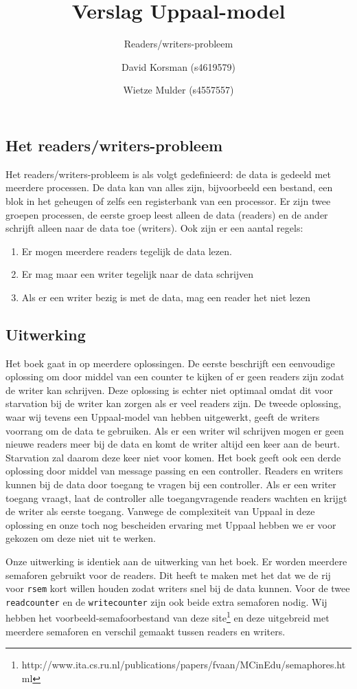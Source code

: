 \documentclass{article}
\title{Verslag Uppaal-model}
\subtitle{Readers/writers-probleem}
\author{David Korsman (s4619579) \and Wietze Mulder (s4557557)}
\begin{document}
\maketitle

\subsection*{Het readers/writers-probleem}
Het readers/writers-probleem is als volgt gedefinieerd: de data is gedeeld met meerdere processen. De data kan van alles zijn, bijvoorbeeld een bestand, een blok in het geheugen of zelfs een registerbank van een processor. Er zijn twee groepen processen, de eerste groep leest alleen de data (readers) en de ander schrijft alleen naar de data toe (writers). Ook zijn er een aantal regels:
\begin{enumerate}
\item Er mogen meerdere readers tegelijk de data lezen.
\item Er mag maar een writer tegelijk naar de data schrijven
\item Als er een writer bezig is met de data, mag een reader het niet lezen
\end{enumerate}

\subsection*{Uitwerking}
Het boek gaat in op meerdere oplossingen. De eerste beschrijft een eenvoudige oplossing om door middel van een counter te kijken of er geen readers zijn zodat de writer kan schrijven. Deze oplossing is echter niet optimaal omdat dit voor starvation bij de writer kan zorgen als er veel readers zijn. De tweede oplossing, waar wij tevens een Uppaal-model van hebben uitgewerkt, geeft de writers voorrang om de data te gebruiken. Als er een writer wil schrijven mogen er geen nieuwe readers meer bij de data en komt de writer altijd een keer aan de beurt. Starvation zal daarom deze keer niet voor komen. Het boek geeft ook een derde oplossing door middel van message passing en een controller. Readers en writers kunnen bij de data door toegang te vragen bij een controller. Als er een writer toegang vraagt, laat de controller alle toegangvragende readers wachten en krijgt de writer als eerste toegang. Vanwege de complexiteit van Uppaal in deze oplossing en onze toch nog bescheiden ervaring met Uppaal hebben we er voor gekozen om deze niet uit te werken.

Onze uitwerking is identiek aan de uitwerking van het boek. Er worden meerdere semaforen gebruikt voor de readers. Dit heeft te maken met het dat we de rij voor \texttt{rsem} kort willen houden zodat writers snel bij de data kunnen. Voor de twee \texttt{readcounter} en de \texttt{writecounter} zijn ook beide extra semaforen nodig. Wij hebben het voorbeeld-semafoorbestand van deze site\footnote{http://www.ita.cs.ru.nl/publications/papers/fvaan/MCinEdu/semaphores.html} en deze uitgebreid met meerdere semaforen en verschil gemaakt tussen readers en writers.
\end{document}
